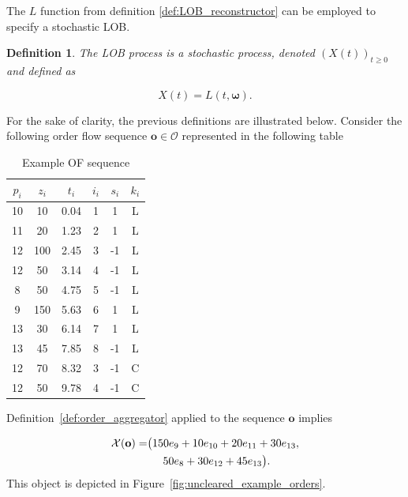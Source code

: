 \documentclass[10pt,a4paper,oneside]{article}
\newtheorem{definition}{Definition}
\begin{document}
The $L$ function from definition \ref{def:LOB_reconstructor} can be employed to specify a stochastic LOB.

\begin{definition} The LOB process is a stochastic process, denoted $(X(t))_{t \geq 0}$ and defined as

\begin{equation*}
X(t) = L(t, \boldsymbol{\omega}).
\end{equation*}
\label{def:lob_process}
\end{definition}

For the sake of clarity, the previous definitions are illustrated below. Consider the following order flow sequence $\mathbf{o} \in \mathcal{O}$ represented in the following table

\begin{table}[H]
  \caption{Example OF sequence}
  \label{tab:of_example}

\centering
\begin{tabular}{cccccc}
\hline
$p_i$ & $z_i$ & $t_i$ & $i_i$ & $s_i$ & $k_i$ \\ \hline
10    & 10   & 0.04      & 1          & 1    & L    \\
11    & 20   & 1.23      & 2          & 1    & L    \\
12    & 100  & 2.45      & 3          & -1   & L    \\
12    & 50   & 3.14      & 4          & -1   & L    \\
8     & 50   & 4.75      & 5          & -1   & L    \\
9     & 150  & 5.63      & 6          & 1    & L    \\
13    & 30   & 6.14      & 7          & 1    & L    \\
13    & 45   & 7.85      & 8          & -1   & L    \\
12    & 70   & 8.32      & 3          & -1   & C    \\
12    & 50   & 9.78      & 4          & -1   & C    \\ \hline
\end{tabular}

\end{table}

Definition~\ref{def:order_aggregator} applied to the sequence $\mathbf{o}$ implies

\begin{align*}
    \mathcal{X}(\mathbf{o}) = &\big(150 e_{9} + 10 e_{10} + 20 e_{11} + 30 e_{13}, \\
                               &\hspace{5mm} 50 e_8 + 30 e_{12} + 45 e_{13}\big).
\end{align*}
This object is depicted in Figure~\ref{fig:uncleared_example_orders}.
\end{document}
